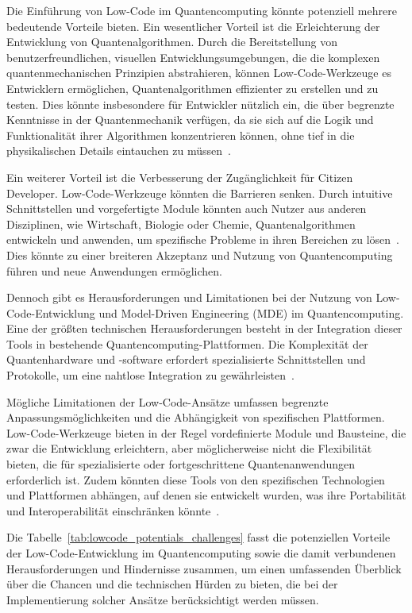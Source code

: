 Die Einführung von Low-Code im Quantencomputing könnte potenziell mehrere bedeutende Vorteile bieten. 
Ein wesentlicher Vorteil ist die Erleichterung der Entwicklung von Quantenalgorithmen. Durch die 
Bereitstellung von benutzerfreundlichen, visuellen Entwicklungsumgebungen, die die komplexen 
quantenmechanischen Prinzipien abstrahieren, können Low-Code-Werkzeuge es Entwicklern ermöglichen, 
Quantenalgorithmen effizienter zu erstellen und zu testen. Dies könnte insbesondere für Entwickler nützlich 
ein, die über begrenzte Kenntnisse in der Quantenmechanik verfügen, da sie sich auf die Logik und 
Funktionalität ihrer Algorithmen konzentrieren können, ohne tief in die physikalischen Details 
eintauchen zu müssen~\cite{Cabot_2020}.

Ein weiterer Vorteil ist die Verbesserung der Zugänglichkeit für Citizen Developer. Low-Code-Werkzeuge 
könnten die Barrieren senken. Durch intuitive Schnittstellen und vorgefertigte Module könnten auch Nutzer 
aus anderen Disziplinen, wie Wirtschaft, Biologie oder Chemie, Quantenalgorithmen entwickeln und 
anwenden, um spezifische Probleme in ihren Bereichen zu lösen~\cite{di2022low}. Dies könnte zu 
einer breiteren Akzeptanz und Nutzung von Quantencomputing führen und neue Anwendungen ermöglichen.

Dennoch gibt es Herausforderungen und Limitationen bei der Nutzung von Low-Code-Entwicklung und 
Model-Driven Engineering (MDE) im Quantencomputing. Eine der größten technischen Herausforderungen 
besteht in der Integration dieser Tools in bestehende Quantencomputing-Plattformen. Die Komplexität 
der Quantenhardware und -software erfordert spezialisierte Schnittstellen und Protokolle, um eine 
nahtlose Integration zu gewährleisten~\cite{monroe2013scaling}.

Mögliche Limitationen der Low-Code-Ansätze umfassen begrenzte Anpassungsmöglichkeiten und die 
Abhängigkeit von spezifischen Plattformen. Low-Code-Werkzeuge bieten in der Regel vordefinierte 
Module und Bausteine, die zwar die Entwicklung erleichtern, aber möglicherweise nicht die 
Flexibilität bieten, die für spezialisierte oder fortgeschrittene Quantenanwendungen erforderlich 
ist. Zudem könnten diese Tools von den spezifischen Technologien und Plattformen abhängen, auf denen 
sie entwickelt wurden, was ihre Portabilität und Interoperabilität einschränken könnte~\cite{nielsen2010quantum}.

Die Tabelle~\ref{tab:lowcode_potentials_challenges} fasst die potenziellen Vorteile der 
Low-Code-Entwicklung im Quantencomputing sowie die damit verbundenen Herausforderungen und Hindernisse 
zusammen, um einen umfassenden Überblick über die Chancen und die technischen Hürden zu bieten, die 
bei der Implementierung solcher Ansätze berücksichtigt werden müssen.

